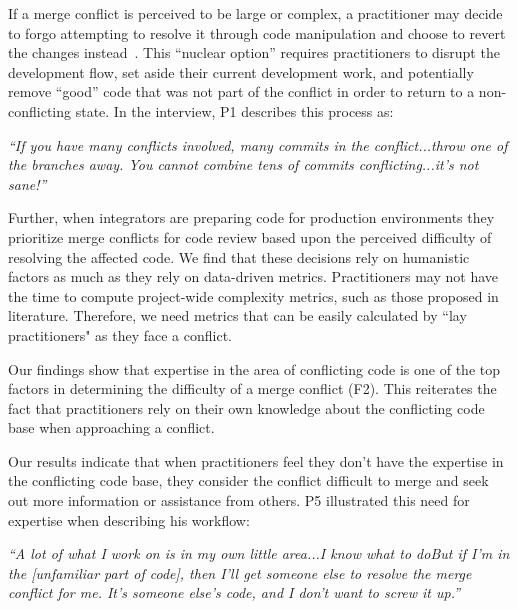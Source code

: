 If a merge conflict is perceived to be large or complex, a practitioner may decide to forgo attempting to resolve it through code manipulation and choose to revert the changes instead~\cite{Guzzi2015}.
This ``nuclear option'' requires practitioners to disrupt the development flow, set aside their current development work, and potentially remove ``good'' code that was not part of the conflict in order to return to a non-conflicting state.
In the interview, P1 describes this process as:
\begin{displayquote}
\textit{``If you have many conflicts involved, many commits in the conflict...throw one of the branches away. You cannot combine tens of commits conflicting...it's not sane!''}
\end{displayquote}

Further, when integrators are preparing code for production environments they prioritize merge conflicts for code review based upon the perceived difficulty of resolving the affected code.
We find that these decisions rely on humanistic factors as much as they rely on data-driven metrics.
Practitioners may not have the time to compute project-wide complexity metrics, such as those proposed in  literature. Therefore, we need metrics that can be easily calculated by ``lay practitioners" as they face a conflict. 

\label{knowledge-based-factors}
Our findings show that expertise in the area of conflicting code is one of the top factors in determining the difficulty of a merge conflict (F2). This reiterates the fact that practitioners rely on their own knowledge about the conflicting code base when approaching a conflict. 

Our results indicate that when practitioners feel they don't have the expertise in the conflicting code base, they consider the conflict difficult to merge and seek out more information or assistance from others. 
P5 illustrated this need for expertise when describing his workflow: 
\begin{displayquote}
	\textit{``A lot of what I work on is in my own little area...I know what to do\textellipsis But if I'm in the [unfamiliar part of code], then I'll get someone else to resolve the merge conflict for me. It's someone else's code, and I don't want to screw it up.''}
\end{displayquote}



